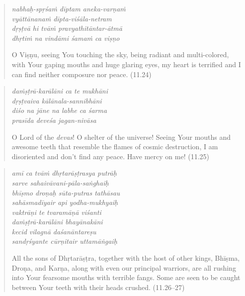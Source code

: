 \documentclass[12pt, twoside, openright]{memoir}
\begin{document}
\par
\begin{verse}
\textit{nabhaḥ-spṛśaṁ dīptam aneka-varṇaṁ} \\
\textit{vyāttānanaṁ dīpta-viśāla-netram} \\
\textit{dṛṣṭvā hi tvāṁ pravyathitāntar-ātmā} \\
\textit{dhṛtiṁ na vindāmi śamaṁ ca viṣṇo}

\noindent O Viṣṇu, seeing You touching the sky, being radiant and multi-colored, with Your gaping mouths and huge glaring eyes, my heart is terrified and I can find neither composure nor peace. (11.24)
\end{verse}
\par



\par
\begin{verse}
\textit{daṁṣṭrā-karālāni ca te mukhāni} \\
\textit{dṛṣṭvaiva kālānala-sannibhāni} \\
\textit{diśo na jāne na labhe ca śarma} \\
\textit{prasīda deveśa jagan-nivāsa}

\noindent O Lord of the \textit{devas}! O shelter of the universe! Seeing Your mouths and awesome teeth that resemble the flames of cosmic destruction, I am disoriented and don't find any peace. Have mercy on me! (11.25)
\end{verse}
\par



\par
\begin{verse}
\textit{amī ca tvāṁ dhṛtarāṣṭrasya putrāḥ} \\
\textit{sarve sahaivāvani-pāla-saṅghaiḥ} \\
\textit{bhīṣmo droṇaḥ sūta-putras tathāsau} \\
\textit{sahāsmadīyair api yodha-mukhyaiḥ} \\
\textit{vaktrāṇi te tvaramāṇā viśanti} \\
\textit{daṁṣṭrā-karālāni bhayānakāni} \\
\textit{kecid vilagnā daśanāntareṣu} \\
\textit{sandṛśyante cūrṇitair uttamāṅgaiḥ}

\noindent All the sons of Dhṛtarāṣṭra, together with the host of other kings, Bhīṣma, Droṇa, and Karṇa, along with even our principal warriors, are all rushing into Your fearsome mouths with terrible fangs. Some are seen to be caught between Your teeth with their heads crushed. (11.26–27)
\end{verse}
\par
\end{document}
